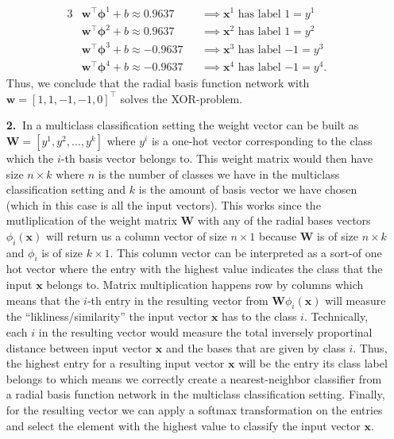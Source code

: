 \documentclass [10pt]{article}
\begin{document}
\begin{enumerate}
	\begin{alignat}{3}
		&\textbf{w}^{\top}\boldsymbol{\phi}^{1}+b \approx 0.9637 &&\implies \text{$\textbf{x}^{1}$ has label $1=y^{1}$} \nonumber \\
		&\textbf{w}^{\top}\boldsymbol{\phi}^{2}+b \approx 0.9637 &&\implies \text{$\textbf{x}^{2}$ has label $1=y^{2}$} \nonumber \\
		&\textbf{w}^{\top}\boldsymbol{\phi}^{3}+b \approx -0.9637 &&\implies \text{$\textbf{x}^{3}$ has label $-1=y^{3}$} \nonumber \\
		&\textbf{w}^{\top}\boldsymbol{\phi}^{4}+b \approx -0.9637 &&\implies \text{$\textbf{x}^{4}$ has label $-1=y^{4}$}. \nonumber
	\end{alignat}
	Thus, we conclude that the radial basis function network with $\textbf{w}=[1,1,-1,-1,0]^{\top}$ solves the XOR-problem.
	\item[\textbf{2.$\>$}]In a multiclass classification setting the weight vector can be built as $\textbf{W} = [y^{1}, y^{2},\dots,y^{k}]$ where $y^{i}$ is a one-hot vector corresponding to the class which the $i$-th basis vector belongs to. This weight matrix would then have size $n\times k$ where $n$ is the number of classes we have in the multiclass classification setting and $k$ is the amount of basis vector we have chosen (which in this case is all the input vectors). This works since the mutliplication of the weight matrix $\textbf{W}$ with any of the radial bases vectors $\phi_{i}(\textbf{x})$ will return us a column vector of size $n\times 1$ because $\textbf{W}$ is of size $n\times k$ and $\phi_{i}$ is of size $k\times 1$. This column vector can be interpreted as a sort-of one hot vector where the entry with the highest value indicates the class that the input $\textbf{x}$ belongs to. Matrix multiplication happens row by columns which means that the $i$-th entry in the resulting vector from $\textbf{W}\phi_{i}(\textbf{x})$ will measure the ``likliness/similarity'' the input vector $\textbf{x}$ has to the class $i$. Technically, each $i$ in the resulting vector would measure the total inversely proportinal distance between input vector $\textbf{x}$ and the bases that are given by class $i$. Thus, the highest entry for a resulting input vector $\textbf{x}$ will be the entry its class label belongs to which means we correctly create a nearest-neighbor classifier from a radial basis function network in the multiclass classification setting. Finally, for the resulting vector we can apply a softmax transformation on the entries and select the element with the highest value to classify the input vector $\textbf{x}$.

\end{enumerate}
\end{document}
